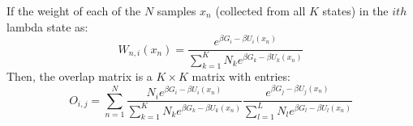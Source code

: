 If the weight of each of the $N$ samples $x_{n}$ (collected from all $K$ states) in the $ith$ lambda state as:
\begin{equation}
W_{n,i}(x_{n}) = \frac{e^{\beta G_{i} - \beta U_{i}(x_{n})}}{\sum_{k=1}^{K} N_{k}e^{\beta G_{k}-\beta U_{k}(x_{n})}}
\label{Eq:FEM:TP:weights}
\end{equation}
Then, the overlap matrix is a $K \times K$ matrix with entries:
\begin{equation}
O_{i,j} = \sum_{n=1}^{N}\frac{N_{i} e^{\beta G_{i} - \beta U_{i}(x_{n})}}{\sum_{k=1}^{K} N_{k}e^{\beta G_{k}-\beta U_{k}(x_{n})}}\frac{e^{\beta G_{j} - \beta U_{j}(x_{n})}}{\sum_{l=1}^{L} N_{l}e^{\beta G_{l}-\beta U_{l}(x_{n})}}
\label{Eq:FEM:TP:om}
\end{equation}
